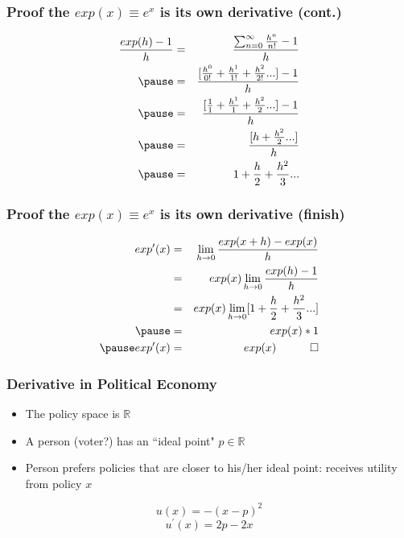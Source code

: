 \documentclass[aspectratio=169, handout]{beamer}
\numberwithin{equation}{section}
\begin{document}
\begin{frame}
\frametitle{Proof the $exp(x)\equiv e^x$ is its own derivative (cont.)}


\begin{eqnarray}
\frac{exp(h)-1}{h}&=&\frac{\sum_{n=0}^{\infty} \frac{h^n}{n!}-1}{h}\nonumber\\\pause
&=&\frac{[\frac{h^0}{0!}+\frac{h^1}{1!}+\frac{h^2}{2!}...]-1}{h}\nonumber\\\pause
&=&\frac{[\frac{1}{1}+\frac{h^1}{1}+\frac{h^2}{2}...]-1}{h}\nonumber\\\pause
&=&\frac{[h+\frac{h^2}{2}...]}{h}\nonumber\\\pause
&=&1+\frac{h}{2}+\frac{h^2}{3}...\nonumber
\end{eqnarray}


\end{frame}

\begin{frame}
\frametitle{Proof the $exp(x)\equiv e^x$ is its own derivative (finish)}



\begin{eqnarray}
exp'(x) &=& \lim_{h\rightarrow 0} \frac{exp(x+h)-exp(x)}{h} \nonumber\\
&=& exp(x)\lim_{h\rightarrow 0} \frac{exp(h)-1}{h}\nonumber\\
&=& exp(x)\lim_{h\rightarrow 0}[1+\frac{h}{2}+\frac{h^2}{3}...]\nonumber\\\pause
&=& exp(x)*1\nonumber\\ \pause
exp'(x)&=& exp(x)\quad \qed\nonumber
\end{eqnarray}

\end{frame}


\begin{frame}
\frametitle{Derivative in Political Economy}

\begin{itemize}
\item The policy space is $\mathbb{R}$ \pause
\item A person (voter?)  has an ``ideal point" $p\in \mathbb{R}$ \pause
\item Person prefers policies that are closer to his/her ideal point: receives utility  from policy $x$ 
\end{itemize}
$$u(x)=-(x-p)^2$$
$$u^\prime(x)=2p-2x$$

\end{frame}
\end{document}

